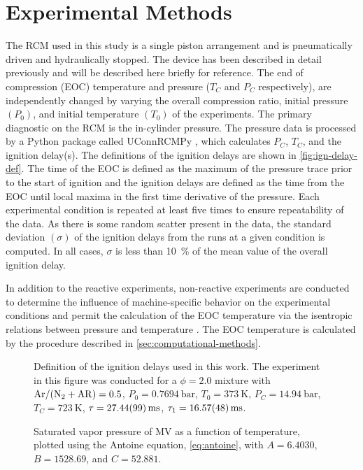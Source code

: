 \documentclass[12pt]{../ussci}
\begin{document}
\section{Experimental Methods}\label{sec:experimental-methods}

The RCM used in this study is a single piston arrangement and is pneumatically
driven and hydraulically stopped. The device has been described in detail
previously \autocite{Mittal2007a} and will be described here briefly for
reference. The end of compression (EOC) temperature and pressure (\(T_C\) and
\(P_C\) respectively), are independently changed by varying the overall
compression ratio, initial pressure \((P_0)\), and initial temperature \((T_0)\)
of the experiments. The primary diagnostic on the RCM is the in-cylinder
pressure. The pressure data is processed by a Python package called UConnRCMPy
\autocite{uconnrcmpy}, which calculates \(P_C\), \(T_C\), and the ignition
delay(s). The definitions of the ignition delays are shown in
\cref{fig:ign-delay-def}. The time of the EOC is defined as the maximum of the
pressure trace prior to the start of ignition and the ignition delays are
defined as the time from the EOC until local maxima in the first time derivative
of the pressure. Each experimental condition is repeated at least five times to
ensure repeatability of the data. As there is some random scatter present in the
data, the standard deviation \((\sigma)\) of the ignition delays from the runs
at a given condition is computed. In all cases, \(\sigma\) is less than
\SI{10}{\percent} of the mean value of the overall ignition delay.

In addition to the reactive experiments, non-reactive experiments are conducted
to determine the influence of machine-specific behavior on the experimental
conditions and permit the calculation of the EOC temperature via the isentropic
relations between pressure and temperature \autocite{Lee1998}. The EOC
temperature is calculated by the procedure described in
\cref{sec:computational-methods}.

\begin{figure}[htb]
    \begin{minipage}[t]{0.48\textwidth}
        \centering
        \resizebox{\linewidth}{!}{}
        \caption{Definition of the ignition delays used in this work. The
        experiment in this figure was conducted for a \(\phi=2.0\) mixture with
        \mbox{\(\ce{Ar}/(\ce{N2}+\ce{AR})=0.5\)}, \(P_0=\SI{0.7694}{\bar}\),
        \(T_0=\SI{373}{\K}\), \(P_C=\SI{14.94}{\bar}\), \(T_C=\SI{723}{\K}\),
        \(\tau=\SI{27.44\pm0.99}{\ms}\), \(\tau_1=\SI{16.57\pm0.48}{\ms}\).}
        \label{fig:ign-delay-def}
    \end{minipage}\hfill%
    \begin{minipage}[t]{0.48\textwidth}
        \centering
        \resizebox{\linewidth}{!}{}
        \caption{Saturated vapor pressure of MV as a function of temperature,
        plotted using the Antoine equation, \cref{eq:antoine}, with
        \(A=6.4030\), \(B=1528.69\), and \(C=52.881\).}
        \label{fig:vapor-pressure}
    \end{minipage}
\end{figure}
\end{document}
